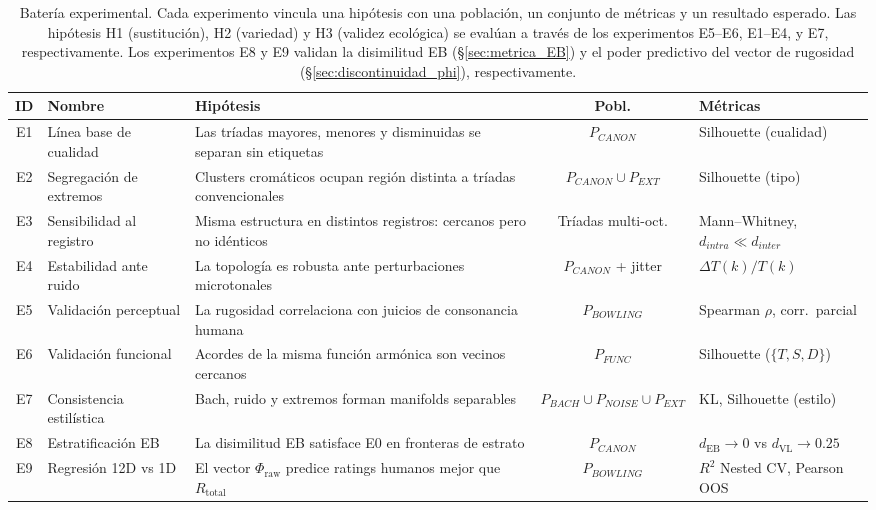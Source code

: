 \begin{table}[h]
\centering
\small
\renewcommand{\arraystretch}{1.3}
\begin{tabular}{|c|p{2.2cm}|p{4.5cm}|c|p{3.2cm}|}
\hline
\textbf{ID} & \textbf{Nombre} & \textbf{Hipótesis} & \textbf{Pobl.} & \textbf{Métricas} \\ \hline
E1 & Línea base de cualidad & Las tríadas mayores, menores y disminuidas se separan sin etiquetas & $P_{CANON}$ & Silhouette (cualidad) \\ \hline
E2 & Segregación de extremos & Clusters cromáticos ocupan región distinta a tríadas convencionales & $P_{CANON} \cup P_{EXT}$ & Silhouette (tipo) \\ \hline
E3 & Sensibilidad al registro & Misma estructura en distintos registros: cercanos pero no idénticos & Tríadas multi-oct. & Mann--Whitney, $d_{intra} \ll d_{inter}$ \\ \hline
E4 & Estabilidad ante ruido & La topología es robusta ante perturbaciones microtonales & $P_{CANON}$ + jitter & $\Delta T(k)/T(k)$ \\ \hline
E5 & Validación perceptual & La rugosidad correlaciona con juicios de consonancia humana & $P_{BOWLING}$ & Spearman $\rho$, corr.\ parcial \\ \hline
E6 & Validación funcional & Acordes de la misma función armónica son vecinos cercanos & $P_{FUNC}$ & Silhouette ($\{T, S, D\}$) \\ \hline
E7 & Consistencia estilística & Bach, ruido y extremos forman manifolds separables & $P_{BACH} \cup P_{NOISE} \cup P_{EXT}$ & KL, Silhouette (estilo) \\ \hline
E8 & Estratificación EB & La disimilitud EB satisface E0 en fronteras de estrato & $P_{CANON}$ & $d_{\text{EB}} \to 0$ vs $d_{\text{VL}} \to 0.25$ \\ \hline
E9 & Regresión 12D vs 1D & El vector $\Phi_{\text{raw}}$ predice ratings humanos mejor que $R_{\text{total}}$ & $P_{BOWLING}$ & $R^2$ Nested CV, Pearson OOS \\ \hline
\end{tabular}
\caption{Batería experimental. Cada experimento vincula una hipótesis con una población, un conjunto de métricas y un resultado esperado. Las hipótesis H1 (sustitución), H2 (variedad) y H3 (validez ecológica) se evalúan a través de los experimentos E5--E6, E1--E4, y E7, respectivamente. Los experimentos E8 y E9 validan la disimilitud EB (§\ref{sec:metrica_EB}) y el poder predictivo del vector de rugosidad (§\ref{sec:discontinuidad_phi}), respectivamente.}
\label{tab:experimentos}
\end{table}

